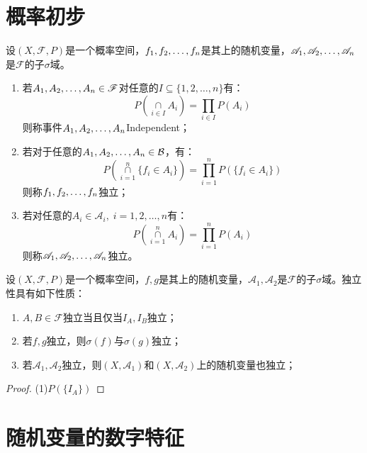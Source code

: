 \chapter{概率初步}
\begin{definition}
	设$(X,\mathscr{F},P)$是一个概率空间，$f_1, f_2, \dots, f_{n}$是其上的随机变量，$\mathscr{A}_1, \mathscr{A}_2, \dots, \mathscr{A}_{n}$是$\mathscr{F}$的子$\sigma$域。\par
	\begin{enumerate}
		\item 若$A_1, A_2, \dots, A_{n}\in\mathscr{F}$对任意的$I\subseteq\{1,2,\dots,n\}$有：
		\begin{equation*}
			P\left(\underset{i\in I}{\overset{}{\cap}}A_i\right)=\prod_{i\in I}^{}P(A_i)
		\end{equation*}
		则称事件$A_1, A_2, \dots, A_{n}$\gls{Independent}；
		\item 	若对于任意的$A_1, A_2, \dots, A_{n}\in\mathcal{B}$，有：
		\begin{equation*}
			P\left(\underset{i=1}{\overset{n}{\cap}}\{f_i\in A_i\}\right)=\prod_{i=1}^{n}P(\{f_i\in A_i\})
		\end{equation*}
		则称$f_1, f_2, \dots, f_{n}$独立；
		\item 若对任意的$A_i\in\mathscr{A}_i,\;i=1,2,\dots,n$有：
		\begin{equation*}
			P\left(\underset{i=1}{\overset{n}{\cap}}A_i\right)=\prod_{i=1}^{n}P(A_i)
		\end{equation*}
		则称$\mathscr{A}_1, \mathscr{A}_2, \dots, \mathscr{A}_{n}$独立。
	\end{enumerate}
\end{definition}
\begin{property}\label{prop:Independent}
	设$(X,\mathscr{F},P)$是一个概率空间，$f,g$是其上的随机变量，$\mathscr{A}_1,\mathscr{A}_2$是$\mathscr{F}$的子$\sigma$域。独立性具有如下性质：
	\begin{enumerate}
		\item $A,B\in\mathscr{F}$独立当且仅当$I_A,I_B$独立；
		\item 若$f,g$独立，则$\sigma(f)$与$\sigma(g)$独立；
		\item 若$\mathscr{A}_1,\mathscr{A}_2$独立，则$(X,\mathscr{A}_1)$和$(X,\mathscr{A}_2)$上的随机变量也独立；
	\end{enumerate}
\end{property}
\begin{proof}
	(1)$P(\{I_A\})$
\end{proof}

\chapter{随机变量的数字特征}










